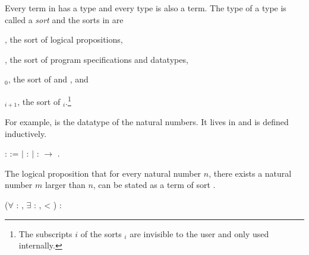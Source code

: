 Every term in \Coq has a type and every type is also a
term. The type of a type is called a \emph{sort} and the sorts
in \Coq are
\begin{compactitem}
\item {}, the sort of logical propositions,
\item {}, the sort of program specifications and datatypes,
\item {}$_0$, the sort of  and
  , and
\item {}$_{i+1}$, the sort of
  $_i$.\footnote{The subscripts $i$ of the sorts
    $_i$ are invisible to the user and only used
    internally.}
\end{compactitem}
For example,
is the datatype of the natural numbers. It lives in  and
is defined inductively.
\begin{singlespace}
\begin{coqdoccode}
\coqdocnoindent
{} 
:
 :=\coqdoceol
\coqdocindent{1.0em}
\ensuremath{|} 
:
\coqdoceol
\coqdocindent{1.0em}
\ensuremath{|} 
:
 $\rightarrow$
.\coqdoceol
\end{coqdoccode}
\end{singlespace}
The logical proposition that for every natural number $n$, there
exists a natural number $m$ larger than $n$, can be stated as a term
of sort .
\begin{singlespace}
\begin{coqdoccode}
\coqdocnoindent
(\ensuremath{\forall}  :
,
\ensuremath{\exists}  :
,
 < ) : \coqdoceol
\end{coqdoccode}
\end{singlespace}
